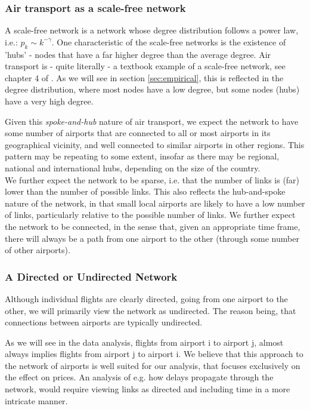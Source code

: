 \subsubsection{Air transport as a scale-free network}
A scale-free network is a network whose degree distribution follows a power law, i.e.: $p_k \sim k^{-\gamma}$. One characteristic of the scale-free networks is the existence of 'hubs' - nodes that have a far higher degree than the average degree. Air transport is - quite literally - a textbook example of a scale-free network, see chapter 4 of \citet{Barabasi}. As we will see in section \ref{sec:empirical}, this is reflected in the degree distribution, where most nodes have a low degree, but some nodes (hubs) have a very high degree.

Given this \textit{spoke-and-hub} nature of air transport, we expect the network to have some number of airports that are connected to all or most airports in its geographical vicinity, and well connected to similar airports in other regions. This pattern may be repeating to some extent, insofar as there may be regional, national and international hubs, depending on the size of the country. \\ 
\medskip
We further expect the network to be sparse, i.e. that the number of links is (far) lower than the number of possible links. This also reflects the hub-and-spoke nature of the network, in that small local airports are likely to have a low number of links, particularly relative to the possible number of links. We further expect the network to be connected, in the sense that, given an appropriate time frame, there will always be a path from one airport to the other (through some number of other airports).

\subsubsection{A Directed or Undirected Network}
Although individual flights are clearly directed, going from one airport to the other, we will primarily view the network as undirected. The reason being, that connections between airports are typically undirected.

As we will see in the data analysis, flights from airport i to airport j, almost always implies flights from airport j to airport i. We believe that this approach to the network of airports is well suited for our analysis, that focuses exclusively on the effect on prices. An analysis of e.g. how delays propagate through the network, would require viewing links as directed and including time in a more intricate manner.\\

